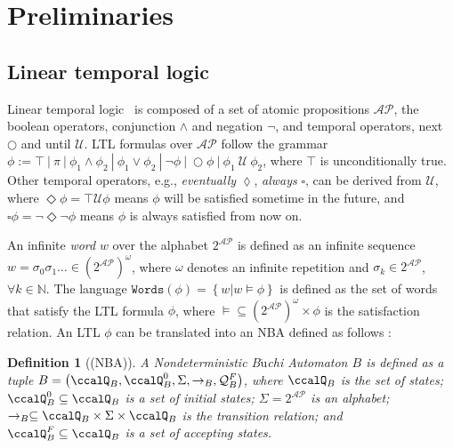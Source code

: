 \documentclass[Afour,sageh,times]{sagej}
\newtheorem{defn}[thm]{Definition}
\begin{document}
\section{Preliminaries}\label{sec:preliminaries}
\subsection{Linear temporal logic}\label{sec:ltl}
Linear temporal logic~\cite{baier2008principles} is composed of a set of atomic propositions $\mathcal{AP}$, the boolean operators, conjunction $\wedge$ and negation $\neg$, and temporal operators, next $\bigcirc$ and until $\mathcal{U}$. LTL formulas over $\mathcal{AP}$ follow the grammar $\phi:=\top~|~\pi~|~\phi_1\wedge\phi_2~|~\phi_1\vee\phi_2~|~\neg\phi~|~\bigcirc\phi~|~\phi_1~\mathcal{U}~\phi_2$, where $\top$ is unconditionally true.   Other temporal operators, e.g., \textit{eventually} $\lozenge$, \textit{always} $\square$, can be derived from $\mathcal{U}$, where $\Diamond \phi = \top \mathcal{U} \phi$ means $\phi$ will be satisfied sometime in the future, and $\square \phi = \neg \Diamond \neg \phi$ means $\phi$ is always satisfied from now on. %

An infinite \textit{word} $w$ over the alphabet $2^{\mathcal{AP}}$ is defined as an infinite sequence  $w=\sigma_0\sigma_1\ldots\in (2^{\mathcal{AP}})^{\omega}$, where $\omega$ denotes an infinite repetition and $\sigma_k\in2^{\mathcal{AP}}$, $\forall k\in\mathbb{N}$. The language $\texttt{Words}(\phi)=\left\{w|w\models\phi\right\}$ is defined as the set of words that satisfy the LTL formula $\phi$, where $\models\subseteq (2^{\mathcal{AP}})^{\omega}\times\phi$ is the satisfaction relation. An LTL $\phi$ can be translated into an NBA  defined as follows \citep{vardi1986automata}:
\begin{defn}[(NBA)]\label{def:nba}
  A \textit{Nondeterministic B$\ddot{\text{u}}$chi Automaton} $B$ is defined as a tuple $B=\left(\ccalQ_{B}, \ccalQ_{B}^0,\Sigma,\rightarrow_B,\mathcal{Q}_B^F\right)$, where $\ccalQ_{B}$ is the set of states; $\ccalQ_{B}^0\subseteq\ccalQ_{B}$ is a set of initial states; $\Sigma=2^{\mathcal{AP}}$ is an alphabet;  $\rightarrow_{B}\subseteq\ccalQ_{B}\times \Sigma\times\ccalQ_{B}$ is the transition relation;
and $\ccalQ_B^F\subseteq\ccalQ_{B}$ is a set of accepting states.
\end{defn}
\end{document}

